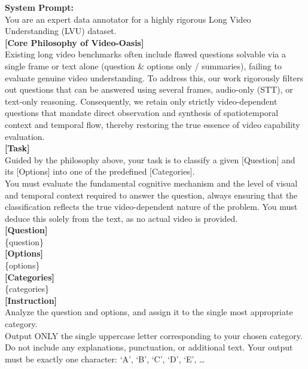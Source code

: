         \begin{table}[t!] \centering
        \begin{tcolorbox}[colback=gray!5, colframe=gray!50, arc=2mm, boxrule=0.5pt, left=2mm, right=2mm, top=2mm, bottom=2mm] \footnotesize
        \textbf{System Prompt:} \\
        You are an expert data annotator for a highly rigorous Long Video Understanding (LVU) dataset. \\
        
        \textbf{[Core Philosophy of Video-Oasis]} \\
        Existing long video benchmarks often include flawed questions solvable via a single frame or text alone (question \& options only / summaries), failing to evaluate genuine video understanding. To address this, our work rigorously filters out questions that can be answered using several frames, audio-only (STT), or text-only reasoning. Consequently, we retain only strictly video-dependent questions that mandate direct observation and synthesis of spatiotemporal context and temporal flow, thereby restoring the true essence of video capability evaluation. \\
        
        \textbf{[Task]} \\
        Guided by the philosophy above, your task is to classify a given [Question] and its [Options] into one of the predefined [Categories]. \\
        You must evaluate the fundamental cognitive mechanism and the level of visual and temporal context required to answer the question, always ensuring that the classification reflects the true video-dependent nature of the problem. You must deduce this solely from the text, as no actual video is provided. \\
        
        \textbf{[Question]} \\
        \{question\} \\
        
        \textbf{[Options]} \\
        \{options\} \\
        
        \textbf{[Categories]} \\
        \{categories\} \\
        
        \textbf{[Instruction]} \\
        Analyze the question and options, and assign it to the single most appropriate category. \\
        Output ONLY the single uppercase letter corresponding to your chosen category. \\
        Do not include any explanations, punctuation, or additional text. Your output must be exactly one character: `A', `B', `C', `D', `E', 
        \dots
        \end{tcolorbox}
        \caption{Prompt template used to assign each surviving QA pair to one of the defined video-native challenge categories.}
        \label{tab:prompt_categorization}
        \vspace{-8mm}
        \end{table}


